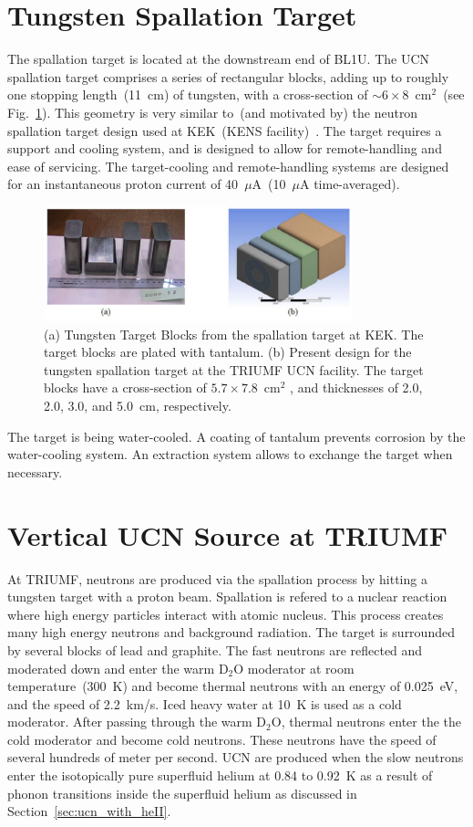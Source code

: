 \section{Tungsten Spallation Target\label{sec:target}}
The spallation target is located at the downstream end of BL1U. The
UCN spallation target comprises a series of rectangular blocks, adding
up to roughly one stopping length~(11~cm) of tungsten, with a
cross-section of $\sim6 \times 8$~cm$^2$~(see
Fig.~\ref{fig:target}). This geometry is very similar to~(and
motivated by) the neutron spallation target design used at KEK~(KENS
facility)~\cite{kawai2001fabrication}. The target requires a support
and cooling system, and is designed to allow for remote-handling and
ease of servicing. The target-cooling and remote-handling systems are
designed for an instantaneous proton current of 40~$\mu$A~(10~$\mu$A
time-averaged).
\begin{figure}[h!]
  \centering
  \includegraphics[width=0.8\textwidth]{target.png}
  \caption{(a) Tungsten Target Blocks from the spallation target at
    KEK. The target blocks are plated with tantalum. (b) Present
    design for the tungsten spallation target at the TRIUMF UCN
    facility. The target blocks have a cross-section of
    $5.7 \times 7.8$~cm$^2$ , and thicknesses of 2.0, 2.0, 3.0, and
    5.0~cm, respectively.}
  \label{fig:target}
\end{figure}
The target is being water-cooled. A coating of tantalum prevents
corrosion by the water-cooling system. An extraction system allows to
exchange the target when necessary.


\section{Vertical UCN Source at TRIUMF\label{sec:vertical_source}}
At TRIUMF, neutrons are produced via the spallation process by hitting
a tungsten target with a proton beam. Spallation is refered to a
nuclear reaction where high energy particles interact with atomic
nucleus. This process creates many high energy neutrons and background
radiation. The target is surrounded by several blocks of lead and
graphite. The fast neutrons are reflected and moderated down and enter
the warm D$_2$O moderator at room temperature~(300~K) and become
thermal neutrons with an energy of 0.025~eV, and the speed of 2.2~km/s.
Iced heavy water at 10~K is used as a cold moderator. After passing
through the warm D$_2$O, thermal neutrons enter the the cold moderator
and become cold neutrons. These neutrons have the speed of several
hundreds of meter per second.  UCN are produced when the slow neutrons
enter the isotopically pure superfluid helium at 0.84 to 0.92~K as a
result of phonon transitions inside the superfluid helium as discussed
in Section~\ref{sec:ucn_with_heII}.

